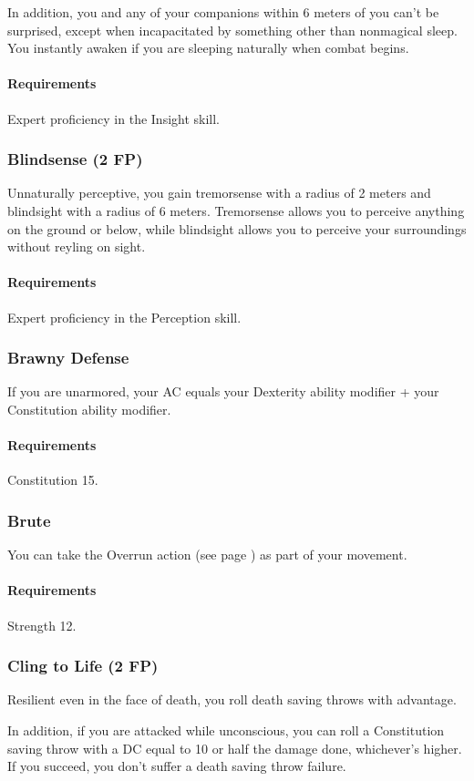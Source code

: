     In addition, you and any of your companions within 6 meters of you can't be surprised, except when incapacitated by something other than nonmagical sleep.
    You instantly awaken if you are sleeping naturally when combat begins.
    \paragraph{Requirements} Expert proficiency in the Insight skill.
\subsubsection{Blindsense (2 FP)} \label{feat::blindsense}
    Unnaturally perceptive, you gain tremorsense with a radius of 2 meters and blindsight with a radius of 6 meters.
    Tremorsense allows you to perceive anything on the ground or below, while blindsight allows you to perceive your surroundings without reyling on sight.
    \paragraph{Requirements} Expert proficiency in the Perception skill.
\subsubsection{Brawny Defense} \label{feat::brawnydefense}
    If you are unarmored, your AC equals your Dexterity ability modifier + your Constitution ability modifier.
    \paragraph{Requirements} Constitution 15.
\subsubsection{Brute} \label{feat::brute}
    You can take the Overrun action (see page \pageref{act::overrun}) as part of your movement.
    \paragraph{Requirements} Strength 12.
\subsubsection{Cling to Life (2 FP)} \label{feat::clingtolife}
    Resilient even in the face of death, you roll death saving throws with advantage.

    In addition, if you are attacked while unconscious, you can roll a Constitution saving throw with a DC equal to 10 or half the damage done, whichever's higher.
    If you succeed, you don't suffer a death saving throw failure.

